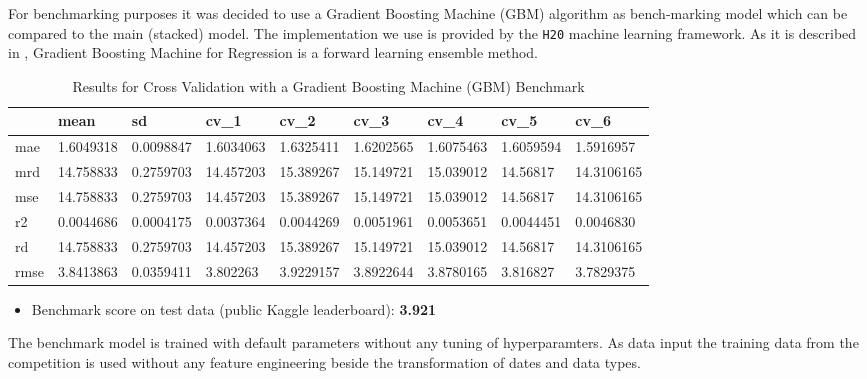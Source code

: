 \documentclass{article}
\begin{document}

For benchmarking purposes it was decided to use a Gradient Boosting Machine (GBM) algorithm as bench-marking model which can be compared to the main (stacked) model. The implementation we use is provided by the \texttt{H20} machine learning framework. As it is described in \cite{h2ogbm}, Gradient Boosting Machine for Regression is a forward learning ensemble method.

\begin{table}[h]
 \caption{Results for Cross Validation with a Gradient Boosting Machine (GBM) Benchmark}
  \centering
  \begin{tabular}{lllllllll}
    \toprule
     &          mean & sd & cv\_1 & cv\_2 & cv\_3 & cv\_4 & cv\_5 & cv\_6\\
    \midrule
    mae&        1.6049318&0.0098847&1.6034063&1.6325411&1.6202565&1.6075463&1.6059594&1.5916957\\
    mrd&        14.758833&0.2759703&14.457203&15.389267&15.149721&15.039012&14.56817&14.3106165\\
    mse&        14.758833&0.2759703&14.457203&15.389267&15.149721&15.039012&14.56817&14.3106165\\
    r2&         0.0044686&0.0004175&0.0037364&0.0044269&0.0051961&0.0053651&0.0044451&0.0046830\\
    rd&         14.758833&0.2759703&14.457203&15.389267&15.149721&15.039012&14.56817&14.3106165\\
    rmse&       3.8413863&0.0359411&3.802263&3.9229157&3.8922644&3.8780165&3.816827&3.7829375\\

    \bottomrule
  \end{tabular}
  \label{tab:gbm_results}
\end{table}

\begin{itemize}
    \item Benchmark score on test data (public Kaggle leaderboard): \textbf{3.921}
\end{itemize}

The benchmark model is trained with default parameters without any tuning of hyperparamters. As data input the training data from the competition is used without any feature engineering beside the transformation of dates and data types.
\end{document}
